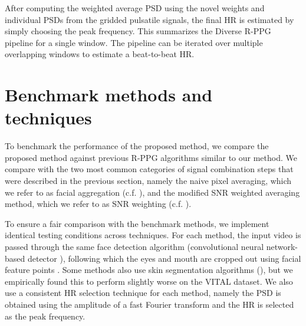 After computing the weighted average PSD using the novel weights and individual PSDs from the gridded pulsatile signals, the final HR is estimated by simply choosing the peak frequency. This summarizes the Diverse R-PPG pipeline for a single window. The pipeline can be iterated over multiple overlapping windows to estimate a beat-to-beat HR.  

\section{Benchmark methods and techniques}

To benchmark the performance of the proposed method, we compare the proposed method against previous R-PPG algorithms similar to our method. We compare with the two most common categories of signal combination steps that were described in the previous section, namely the naive pixel averaging, which we refer to as facial aggregation (c.f. \cite{poh_noncontact_2010,haan_robust_2013,wang_novel_2016,wang_algorithmic_2017,lewandowska_measuring_2011,de_haan_improved_2014}), and the modified SNR weighted averaging method, which we refer to as SNR weighting (c.f. \cite{po_block-based_2018,li_model-based_2020,kumar_distanceppg_2015,bobbia_unsupervised_2019}). 

To ensure a fair comparison with the benchmark methods, we implement identical testing conditions across techniques. For each method, the input video is passed through the same face detection algorithm (convolutional neural network-based detector \cite{zhang_joint_2016}), following which the eyes and mouth are cropped out using facial feature points \cite{kazemi_one_2014}. Some methods also use skin segmentation algorithms (\cite{wang_exploiting_2015,tang_noncontact_2018,villarroel_non-contact_2019}), but we empirically found this to perform slightly worse on the VITAL dataset. We also use a consistent HR selection technique for each method, namely the PSD is obtained using the amplitude of a fast Fourier transform and the HR is selected as the peak frequency.





